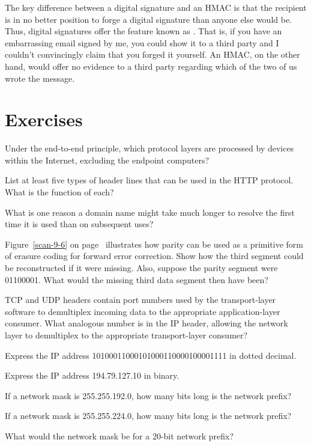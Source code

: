 The key difference between a digital signature and an HMAC is that the
recipient is in no better position to forge a digital signature than
anyone else would be.  Thus, digital signatures offer the feature
known as .  That is, if you have an embarrassing
email signed by me, you could show it to a third party and I couldn't
convincingly claim that you forged it yourself.  An HMAC, on the other
hand, would offer no evidence to a third party regarding which of the
two of us wrote the message.

\section*{Exercises}

\begin{chapterEnumerate}
\item
Under the end-to-end principle, which protocol layers are processed by
devices within the Internet, excluding the endpoint computers?
\item
List at least five types of header lines that can be used in the HTTP
protocol.  What is the function of each?
\item
What is one reason a domain name might take much longer to resolve the first time it
is used than on subsequent uses?
\item
Figure~\ref{scan-9-6} on page~\pageref{scan-9-6} illustrates how parity can be used as a
primitive form of erasure coding for forward error correction.  Show
how the third segment could be reconstructed if it were missing.
Also, suppose the parity segment were 01100001.  What would the
missing third data segment then have been?
\item
TCP and UDP headers contain port numbers used by the transport-layer
software to demultiplex incoming data to the appropriate
application-layer consumer.  What analogous number is in the IP header,
allowing the network layer to demultiplex to the appropriate
transport-layer consumer?
\item
Express the IP address 10100011000101000110000100001111 in dotted
decimal.
\item
Express the IP address 194.79.127.10 in binary.
\item
If a network mask is 255.255.192.0, how many bits long is the network prefix?
\item
If a network mask is 255.255.224.0, how many bits long is the network prefix?
\item
What would the network mask be for a 20-bit network prefix?

\end{chapterEnumerate}
